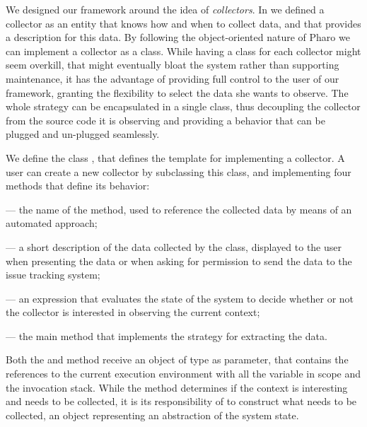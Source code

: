  We designed our framework around the idea of \emph{collectors}. In  we defined a collector as an entity that knows how and when to collect data, and that provides a description for this data. By following the object-oriented nature of Pharo we can implement a collector as a class. While having a class for each collector might seem overkill, that might eventually bloat the system rather than supporting maintenance, it has the advantage of providing full control to the user of our framework, granting the flexibility to select the data she wants to observe. The whole strategy can be encapsulated in a single class, thus decoupling the collector from the source code it is observing and providing a behavior that can be plugged and un-plugged seamlessly.

We define the class , that defines the template for implementing a collector. A user can create a new collector by subclassing this class, and implementing four methods that define its behavior:

\begin{description}

\item {} --- the name of the method, used to reference the collected data by means of an automated approach;

\item {} --- a short description of the data collected by the class, displayed to the user when presenting the data or when asking for permission to send the data to the issue tracking system;

\item {} --- an expression that evaluates the state of the system to decide whether or not the collector is interested in observing the current context;

\item {} --- the main method that implements the strategy for extracting the data.
  
\end{description}

Both the  and  method receive an object of type  as parameter, that contains the references to the current execution environment with all the variable in scope and the invocation stack. While the  method determines if the context is interesting and needs to be collected, it is its responsibility of  to construct what needs to be collected, \eg an object representing an abstraction of the system state.

